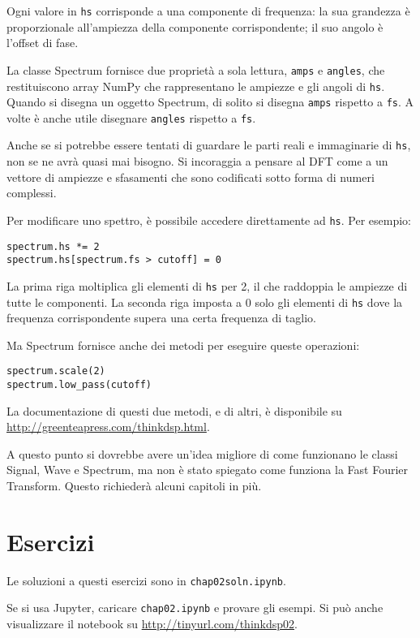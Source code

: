 \documentclass[12pt]{book} \usepackage[width=5.5in,height=8.5in, hmarginratio=3:2,vmarginratio=1:1]{geometry}
\begin{document}
Ogni valore in {\tt hs} corrisponde a una componente di frequenza: la sua grandezza è proporzionale all'ampiezza della componente corrispondente; il suo angolo è l'offset di fase.

La classe Spectrum fornisce due proprietà a sola lettura, {\tt amps} e {\tt angles}, che restituiscono array NumPy che rappresentano le ampiezze e gli angoli di {\tt hs}. Quando si disegna un oggetto Spectrum, di solito si disegna {\tt amps} rispetto a {\tt fs}. A volte è anche utile disegnare {\tt angles} rispetto a {\tt fs}.

Anche se si potrebbe essere tentati di guardare le parti reali e immaginarie di {\tt hs}, non se ne avrà quasi mai bisogno. Si incoraggia a pensare al DFT come a un vettore di ampiezze e sfasamenti che sono codificati sotto forma di numeri complessi.

Per modificare uno spettro, è possibile accedere direttamente ad {\tt hs}. Per esempio:

\begin{verbatim} 
spectrum.hs *= 2
spectrum.hs[spectrum.fs > cutoff] = 0
 \end{verbatim} 

La prima riga moltiplica gli elementi di {\tt hs} per 2, il che raddoppia le ampiezze di tutte le componenti. La seconda riga imposta a 0 solo gli elementi di {\tt hs} dove la frequenza corrispondente supera una certa frequenza di taglio.

Ma Spectrum fornisce anche dei metodi per eseguire queste operazioni:

\begin{verbatim} 
spectrum.scale(2)
spectrum.low_pass(cutoff)
 \end{verbatim} 

La documentazione di questi due metodi, e di altri, è disponibile su \url{http://greenteapress.com/thinkdsp.html}.

A questo punto si dovrebbe avere un'idea migliore di come funzionano le classi Signal, Wave e Spectrum, ma non è stato spiegato come funziona la Fast Fourier Transform. Questo richiederà alcuni capitoli in più.

\section{Esercizi} 

Le soluzioni a questi esercizi sono in {\tt chap02soln.ipynb}.

\begin{exercise} Se si usa Jupyter, caricare {\tt chap02.ipynb} e provare gli esempi. Si può anche visualizzare il notebook su \url{http://tinyurl.com/thinkdsp02}. \end{exercise} 
\end{document}
